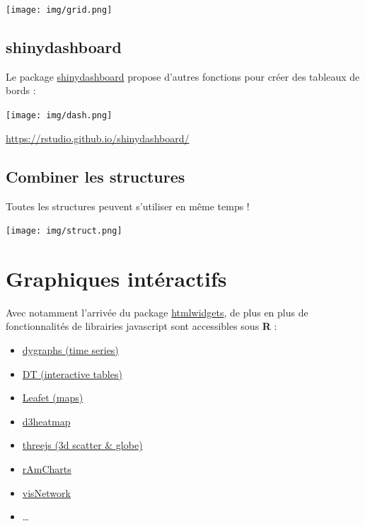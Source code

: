 \documentclass[
]{article}
\providecommand{\tightlist}{%
  \setlength{\itemsep}{0pt}\setlength{\parskip}{0pt}}
\begin{document}
\texttt{[image: img/grid.png]}

\hypertarget{shinydashboard}{%
\subsection{shinydashboard}\label{shinydashboard}}

Le package
\href{https://rstudio.github.io/shinydashboard/}{shinydashboard} propose
d'autres fonctions pour créer des tableaux de bords :

\texttt{[image: img/dash.png]}

\url{https://rstudio.github.io/shinydashboard/}

\hypertarget{combiner-les-structures}{%
\subsection{Combiner les structures}\label{combiner-les-structures}}

Toutes les structures peuvent s'utiliser en même temps !

\texttt{[image: img/struct.png]}

\hypertarget{graphiques-intuxe9ractifs}{%
\section{Graphiques intéractifs}\label{graphiques-intuxe9ractifs}}

Avec notamment l'arrivée du package
\href{http://www.htmlwidgets.org/}{htmlwidgets}, de plus en plus de
fonctionnalités de librairies javascript sont accessibles sous
\textbf{R} :

\begin{itemize}
\tightlist
\item
  \href{http://rstudio.github.io/dygraphs/}{dygraphs (time series)}
\item
  \href{http://rstudio.github.io/DT/}{DT (interactive tables)}
\item
  \href{http://rstudio.github.io/leaflet/}{Leafet (maps)}
\item
  \href{https://github.com/rstudio/d3heatmap}{d3heatmap}
\item
  \href{http://bwlewis.github.io/rthreejs}{threejs (3d scatter \&
  globe)}
\item
  \href{http://datastorm-open.github.io/introduction_ramcharts/}{rAmCharts}
\item
  \href{http://datastorm-open.github.io/visNetwork}{visNetwork}
\item
  \ldots{}
\end{itemize}
\end{document}
